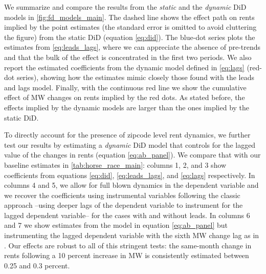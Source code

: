 \begin{figure}
\begin{minipage}{0.95\textwidth}
	\end{minipage}
\end{figure}

We summarize and compare the results from the \textit{static} and the \textit{dynamic} DiD models 
in \autoref{fig:fd_models_main}. The dashed line shows the effect path on rents implied by the 
point estimates (the standard error is omitted to avoid cluttering the figure) from the static DiD 
(equation \ref{eq:did}). The blue-dot series plots the estimates from \autoref{eq:leads_lags}, where 
we can appreciate the absence of pre-trends and that the bulk of the effect is concentrated in the 
first two periods. We also report the estimated coefficients from the dynamic model defined in 
\autoref{eq:lags} (red-dot series), showing how the estimates mimic closely those found with the 
leads and lags model. Finally, with the continuous red line we show the cumulative effect of MW 
changes on rents implied by the red dots. As stated before, the effects implied by the dynamic models 
are larger than the ones implied by the static DiD.

To directly account for the presence of zipcode level rent dynamics, we further test our results by 
estimating a \textit{dynamic} DiD model that controls for the lagged value of the changes in rents 
(equation \ref{eq:ab_panel}). We compare that with our baseline estimates in 
\autoref{tab:horse_race_main}: columns 1, 2, and 3 show coefficients from equations \eqref{eq:did}, 
\eqref{eq:leads_lags}, and \eqref{eq:lags} respectively. In columns 4 and 5, we allow for full blown 
dynamics in the dependent variable and we recover the coefficients using instrumental variables 
following the classic \textcite{arellano1991some} approach --using deeper lags of the dependent 
variable to instrument for the lagged dependent variable-- for the cases with and without leads. 
In columns 6 and 7 we show estimates from the model in equation \ref{eq:ab_panel} but instrumenting 
the lagged dependent variable with the sixth MW change lag as in \textcite{meer2016effects}. Our 
effects are robust to all of this stringent tests: the same-month change in rents following a 10 
percent increase in MW is consistently estimated between 0.25 and 0.3 percent. 



